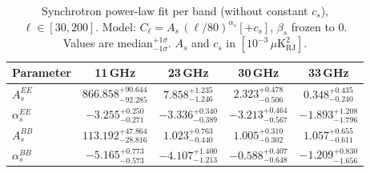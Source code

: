 \begin{table}[htbp]
\centering
\caption{Synchrotron power-law fit per band (without constant $c_s$), $\ell \in [30, 200]$. Model: $C_\ell = A_s\,(\ell/80)^{{\alpha_s}} [+ c_s]$, $\beta_s$ frozen to 0. Values are median$^{{+1\sigma}}_{{-1\sigma}}$. $A_s$ and $c_s$ in $[10^{-3}\,\mu\mathrm{K}^2_\mathrm{RJ}]$.}
\label{tab:sync_single_band_noc_ell30-200}
\begin{tabular}{lcccc}
\toprule
Parameter & 11\,GHz & 23\,GHz & 30\,GHz & 33\,GHz \\
\midrule
$A_s^{EE}$ & $866.858^{+90.644}_{-92.285}$ & $7.858^{+1.235}_{-1.246}$ & $2.323^{+0.478}_{-0.506}$ & $0.348^{+0.435}_{-0.240}$ \\
$\alpha_s^{EE}$ & $-3.255^{+0.250}_{-0.271}$ & $-3.336^{+0.340}_{-0.389}$ & $-3.213^{+0.464}_{-0.567}$ & $-1.893^{+1.208}_{-1.796}$ \\
\midrule
$A_s^{BB}$ & $113.192^{+47.864}_{-28.816}$ & $1.023^{+0.763}_{-0.440}$ & $1.005^{+0.310}_{-0.302}$ & $1.057^{+0.655}_{-0.611}$ \\
$\alpha_s^{BB}$ & $-5.165^{+0.773}_{-0.573}$ & $-4.107^{+1.400}_{-1.213}$ & $-0.588^{+0.407}_{-0.648}$ & $-1.209^{+0.830}_{-1.656}$ \\
\bottomrule
\end{tabular}
\end{table}